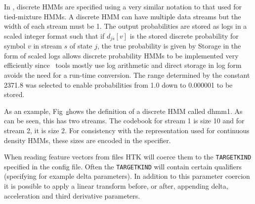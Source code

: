 In \HTK, discrete HMMs are specified using a very similar
notation to that used for tied-mixture HMMs.  A discrete HMM can
have multiple data streams but the width of each stream must be
1.  The output probabilities are stored as logs in a scaled
integer format such that if $d_{js}[v]$ is the stored  discrete
probability  for symbol $v$ in stream $s$ of state $j$, the true
probability is given by
Storage in the form of scaled logs allows discrete probability
HMMs to be implemented very efficiently since \HTK\ tools
mostly use log arithmetic  and direct storage in log form
avoids the need for a run-time conversion.  The
range determined by the constant 2371.8 
was selected to enable probabilities from 1.0 down to
0.000001 to be stored.



As an example, Fig~\href{f:dischmm} shows the definition of a  discrete
HMM called \textsf{dhmm1}.  As can be seen, this has two streams.  The codebook
for stream 1 is size 10 and for stream 2, it is size 2.  For consistency with
the representation used for continuous density HMMs, these sizes are encoded 
in the  specifier.


When reading feature vectors from files HTK will coerce them to the
\texttt{TARGETKIND} specified in the config file. Often the
\texttt{TARGETKIND} will contain certain qualifiers (specifying for
example delta parameters). In addition to this parameter coercion it
is possible to apply a linear transform before, or after, appending
delta, acceleration and third derivative parameters.

